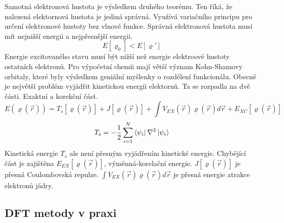 \documentclass[
  digital, %
  table,   %
  lof,     %
  lot,     %
]{fithesis3}
\begin{document}
Samotná elektronová hustota je výsledkem druhého teorému. Ten říká, že nalezená elektornová hustota je jediná správná. Využívá variačního principu pro určení elektronové hustoty bez vlnové funkce. Správná elektronová hustota musí mít nejnižší energii a nejpřesnější energii.
\begin{equation}
E [\varrho_0] < E[\varrho ']
\end{equation}
 Energie excitovaného stavu musí být nižší než energie elektroové hustoty ostatních elektronů. Pro výpočetní chemii mají větší význam Kohn-Shamovy orbitaly, které byly výsledkem geniální myšlenky o rozdělení funkcionálu. Obecně je největší problém vyjádřit kinetickou energii elektornů. Ta se rozpadla na dvě části. Exaktní a korekční část.
\begin{equation}
E(\varrho(\vec{r})) = T_s[\varrho(\vec{r})] + J[\varrho(\vec{r})] + \int V_{EX}(\vec{r})\varrho(\vec{r})d\vec{r} + E_{XC}[\varrho(\vec{r})]
\end{equation}
 \cite{jensen2007introduction}\cite{koch2000chemist}
 \begin{equation}
 T_s = -\frac{1}{2} \sum_{i=1}^{N}  \bra{\psi_i}{\nabla^{2}}\ket{\psi_i}
 \label{kineticka_energie_jednoelektronova}
 \end{equation}
 Kinetická energie $T_s$ ale není přesným vyjádřením kinetické energie. Chybějící část je zajištěna $E_{EX}[\varrho(\vec{r})]$, výměnná-korelační energie. $J[\varrho(\vec{r})]$ je přesná Coulombovská repulze. $\int V_{EX}(\vec{r})\varrho(\vec{r})d\vec{r}$ je přesná energie atrakce elektronů jádry.  \cite{parr1994density}

\subsection{DFT metody v praxi}
\end{document}
